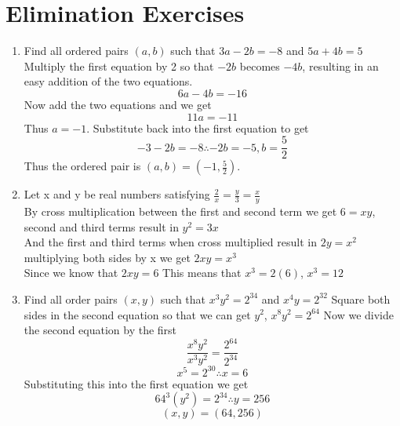 \documentclass[10pt]{article}
\begin{document}
\section{Elimination Exercises}
\begin{enumerate}
    \item Find all ordered pairs $(a,b)$ such that $3a-2b=-8$ and $5a+4b=5$ \\
    Multiply the first equation by 2 so that $-2b$ becomes $-4b$, resulting in an easy addition of the two equations.
    $$6a-4b=-16$$
    Now add the two equations and we get
    $$11a=-11$$
    Thus $a=-1$. Substitute back into the first equation to get
    $$-3-2b=-8 \therefore -2b=-5, b=\frac{5}{2}$$
    Thus the ordered pair is $(a,b)=\left(-1,\frac{5}{2}\right)$.
    \item Let x and y be real numbers satisfying $\frac{2}{x}=\frac{y}{3}=\frac{x}{y}$ \\
      By cross multiplication between the first and second term we get $6=xy$, second and third terms result in $y^2=3x$ \\
      And the first and third terms when cross multiplied result in $2y=x^2$ multiplying both sides by x we get $2xy=x^3$ \\
      Since we know that $2xy=6$ This means that $x^3=2(6)$, $\boxed{x^3=12}$
    \item Find all order pairs $(x,y)$ such that $x^3y^2=2^{34}$ and $x^4y=2^{32}$
      Square both sides in the second equation so that we can get $y^2$, $x^8y^2=2^{64}$ Now we divide the second equation by the first
      $$\frac{x^8y^2}{x^3y^2}=\frac{2^{64}}{2^{34}}$$
        $$x^5=2^{30} \therefore x=6 $$ Substituting this into the first equation we get
      $$64^3(y^2)=2^{34} \therefore y=256$$
      $$\boxed{(x,y)=(64,256)}$$


\end{enumerate}
\end{document}
